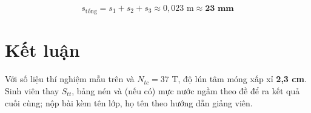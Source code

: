 \documentclass[12pt,a4paper]{article}
\begin{document}
\[ s_{\mathrm{tổng}} = s_1+s_2+s_3 \approx 0{,}023 \text{ m} \approx \mathbf{23 \text{ mm}} \]

\section{Kết luận}
Với số liệu thí nghiệm mẫu trên và $N_{tc}=37$ T, độ lún tâm móng xấp xỉ \textbf{2{,}3 cm}. Sinh viên thay $S_{tt}$, bảng nén và (nếu có) mực nước ngầm theo đề để ra kết quả cuối cùng; nộp bài kèm tên lớp, họ tên theo hướng dẫn giảng viên.
\end{document}
